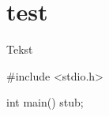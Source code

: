 \documentclass[a4paper,11pt,twoside]{report}
\begin{document}
\chapter{test}

\begin{tdosbox}
Tekst
\end{tdosbox}

\begin{dosbox}[title={Een programma.}]
#include <stdio.h>

int main()
{
    stub;
}
\end{dosbox}
\end{document}
